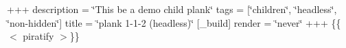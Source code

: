 +++ description = \char`\"{}\+This be a demo child plank\char`\"{} tags = \mbox{[}\char`\"{}children\char`\"{}, \char`\"{}headless\char`\"{}, \char`\"{}non-\/hidden\char`\"{}\mbox{]} title = \char`\"{}plank 1-\/1-\/2 (headless)\char`\"{} \mbox{[}\+\_\+build\mbox{]} render = \char`\"{}never\char`\"{} +++ \{\{$<$ piratify $>$\}\} 